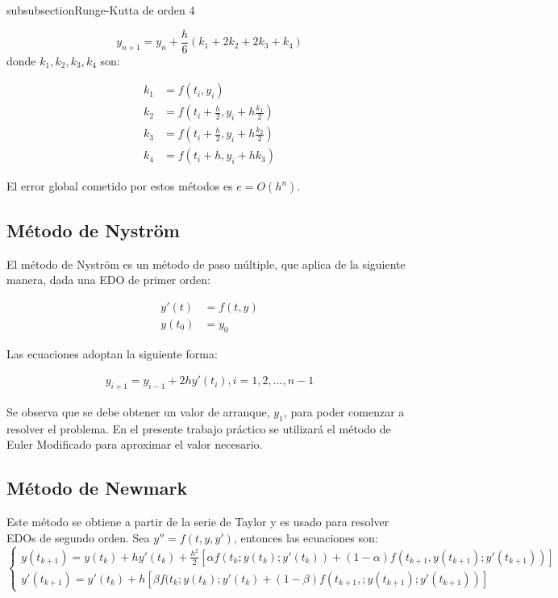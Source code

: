 \documentclass[titlepage,a4paper]{article}
\begin{document}
	subsubsection{Runge-Kutta de orden 4}

	\begin{equation}
		y_{n+1} = y_n + \frac{h}{6} (k_1 + 2k_2 + 2k_3 + k_4)
	\end{equation}
	donde $ k_1, k_2, k_3, k_4 $ son:

	\begin{align*}
		k_1 &= f(t_i, y_i) \\
		k_2 &= f(t_i + \frac{h}{2}, y_i + h \frac{k_1}{2})\\
		k_3 &= f(t_i + \frac{h}{2}, y_i + h \frac{k_2}{2})\\
		k_4 &= f(t_i + h, y_i + h k_3)
	\end{align*}

	El error global cometido por estos métodos es $ e = O(h^n) $.
 
	\subsection{Método de Nystr\"om}

	El método de Nystr\"om es un método de paso múltiple, que aplica de la siguiente manera, dada una EDO de primer orden:

	\begin{align*}
		y'(t) &= f(t, y)\\
		y(t_{0}) &= y_{0}
	\end{align*}

	Las ecuaciones adoptan la siguiente forma: 

	\begin{align*}
		y_{i+1} = y_{i-1} + 2h y'(t_i), i = 1, 2,..., n - 1
	\end{align*}

	Se observa que se debe obtener un valor de arranque, $ y_1 $, para poder comenzar a resolver el problema. En el presente trabajo práctico se utilizará el método de Euler Modificado para aproximar el valor necesario. 

	\subsection{Método de Newmark}
	Este método se obtiene a partir de la serie de Taylor y es usado para resolver EDOs de segundo orden.
	Sea $ y'' = f(t, y, y') $, entonces las ecuaciones son:
	\begin{equation}
		\begin{cases}
		y(t_{k+1}) = y(t_{k}) + hy'(t_{k}) + \frac{h^2}{2}[\alpha f(t_{k}; y(t_{k});y'(t_{k})) + (1 - \alpha) f(t_{k+1}, y(t_{k+1}); y'(t_{k+1}))]\\
		y'(t_{k+1}) = y'(t_{k}) + h[\beta f(t_{k}; y(t_{k}); y'(t_{k}) + (1-\beta)f(t_{k+1},;y(t_{k+1});y'(t_{k+1}))]
		\end{cases}
	\end{equation}
\end{document}
